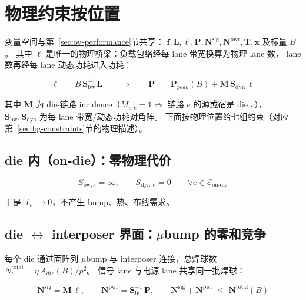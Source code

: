\section{物理约束按位置}\label{sec:ov-physical}

变量空间与第~\ref{sec:ov-performance}节共享：
$\mathbf{f},\mathbf{L},\boldsymbol{\ell},\mathbf{P},\mathbf{N}^{\text{sig}},\mathbf{N}^{\text{pwr}},\mathbf{T},\mathbf{x}$ 及标量 $B$。
其中 $\boldsymbol{\ell}$ 是唯一的物理桥梁：负载包络经每 lane 带宽换算为物理 lane 数，
lane 数再经每 lane 动态功耗进入功耗：

\begin{equation}\label{eq:lane-def}
    \boldsymbol{\ell} \;=\; B\,\mathbf{S}_{\text{bw}}^{-1}\,\mathbf{L}
    \qquad\Longrightarrow\qquad
    \mathbf{P} \;=\; \mathbf{P}_{peak}(B) + \mathbf{M}\,\mathbf{S}_{\text{dyn}}\,\boldsymbol{\ell}
\end{equation}

其中 $\mathbf{M}$ 为 die-链路 incidence（$M_{v,e}=1 \iff$ 链路 $e$ 的源或宿是 die $v$），
$\mathbf{S}_{\text{bw}},\mathbf{S}_{\text{dyn}}$ 为每 lane 带宽/动态功耗对角阵。
下面按物理位置给七组约束（对应第~\ref{sec:bg-constraints}节的物理描述）。

\subsection{die 内（on-die）：零物理代价}\label{sec:ov-ondie}

\begin{equation}\label{eq:ondie}
    S_{\text{bw},e} = \infty,\qquad S_{\text{dyn},e} = 0 \qquad \forall e \in \mathcal{E}_{\text{on-die}}
\end{equation}

于是 $\ell_e \to 0$，不产生 bump、热、布线需求。

\subsection{die $\leftrightarrow$ interposer 界面：$\mu$bump 的零和竞争}\label{sec:ov-ubump}

每个 die 通过面阵列 $\mu$bump 与 interposer 连接，总焊球数 $N_v^{\text{total}} = \eta\,A_{die}(B)/p^2$。
信号 lane 与电源 lane 共享同一批焊球：

\begin{equation}\label{eq:ubump}
    \mathbf{N}^{\text{sig}} = \mathbf{M}\,\boldsymbol{\ell},\qquad
    \mathbf{N}^{\text{pwr}} = \mathbf{S}_{\text{in}}^{-1}\,\mathbf{P},\qquad
    \mathbf{N}^{\text{sig}} + \mathbf{N}^{\text{pwr}} \;\le\; \mathbf{N}^{\text{total}}(B)
\end{equation}

